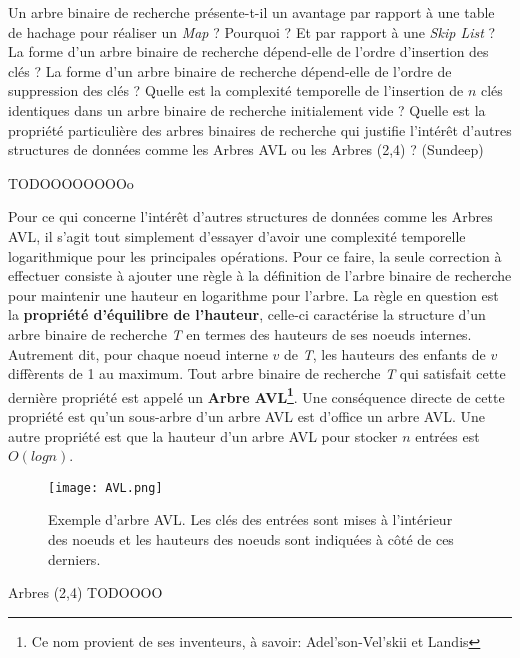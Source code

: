 Un arbre binaire de recherche présente-t-il un avantage par rapport à une table de
hachage pour réaliser un \textit{Map} ? Pourquoi ? Et par rapport à une \textit{Skip List} ? \\
La forme d’un arbre binaire de recherche dépend-elle de l’ordre d’insertion des
clés ? La forme d’un arbre binaire de recherche dépend-elle de l’ordre de suppression
des clés ? Quelle est la complexité temporelle de l’insertion de $\textit{n}$ clés
identiques dans un arbre binaire de recherche initialement vide ? Quelle est la
propriété particulière des arbres binaires de recherche qui justifie l’intérêt d’autres
structures de données comme les Arbres AVL ou les Arbres (2,4) ? (Sundeep) 
\medskip

TODOOOOOOOOo

Pour ce qui concerne l'intérêt d'autres structures de données comme les Arbres AVL, il s'agit tout simplement d'essayer d'avoir une complexité temporelle logarithmique pour les principales opérations. Pour ce faire, la seule correction à effectuer consiste à ajouter une règle à la définition de l'arbre binaire de recherche pour maintenir une hauteur en logarithme pour l'arbre. La règle en question est la \textbf{propriété d'équilibre de l'hauteur}, celle-ci caractérise la structure d'un arbre binaire de recherche \textit{T} en termes des hauteurs de ses noeuds internes. Autrement dit, pour chaque noeud interne $\textit{v}$ de \textit{T}, les hauteurs des enfants de $\textit{v}$ diffèrents de 1 au maximum. Tout arbre binaire de recherche \textit{T} qui satisfait cette dernière propriété est appelé un \textbf{Arbre AVL\footnote{Ce nom provient de ses inventeurs, à savoir: Adel'son-Vel'skii et Landis}}. Une conséquence directe de cette propriété est qu'un sous-arbre d'un arbre AVL est d'office un arbre AVL. Une autre propriété est que la hauteur d'un arbre AVL pour stocker $\textit{n}$ entrées est $\textit{O}(log \textit{n})$.

\begin{figure} [!h]
\center
\texttt{[image: AVL.png]}
\caption{Exemple d'arbre AVL. Les clés des entrées sont mises à l'intérieur des noeuds et les hauteurs des noeuds sont indiquées à côté de ces derniers.}
\end{figure}

Arbres (2,4) TODOOOO		